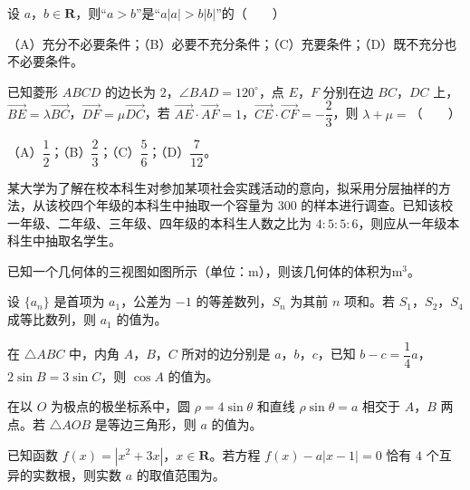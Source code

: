 \begin{question}
设 $a$，$b\in\mathbf R$，则“$a>b$”是“$a|a|>b|b|$”的\mbox{（　　）}

（A）充分不必要条件；（B）必要不充分条件；（C）充要条件；（D）既不充分也不必要条件。

\end{question}
\begin{question}
已知菱形 $ABCD$ 的边长为 $2$，$\angle BAD=120^\circ$，点 $E$，$F$ 分别在边 $BC$，$DC$ 上，$\overrightarrow{BE}=\lambda\overrightarrow{BC}$，$\overrightarrow{DF}=\mu\overrightarrow{DC}$，若 $\overrightarrow{AE}\cdot\overrightarrow{AF}=1$，$\overrightarrow{CE}\cdot\overrightarrow{CF}=-\dfrac23$，则 $\lambda+\mu=$\mbox{（　　）}

（A）$\dfrac12$；（B）$\dfrac23$；（C）$\dfrac56$；（D）$\dfrac{7}{12}$。

\end{question}

\begin{question}
某大学为了解在校本科生对参加某项社会实践活动的意向，拟采用分层抽样的方法，从该校四个年级的本科生中抽取一个容量为 $300$ 的样本进行调查。已知该校一年级、二年级、三年级、四年级的本科生人数之比为 $4:5:5:6$，则应从一年级本科生中抽取\gkblank{}名学生。

\Needspace{0.4\textheight}
\end{question}
\begin{question}
已知一个几何体的三视图如图所示（单位：m），则该几何体的体积为\gkblank{}$\mathrm m^3$。
\nopagebreak[4]
\begin{center}\end{center}
\nopagebreak[4]
\end{question}
\begin{question}
设 $\{a_n\}$ 是首项为 $a_1$，公差为 $-1$ 的等差数列，$S_n$ 为其前 $n$ 项和。若 $S_1$，$S_2$，$S_4$ 成等比数列，则 $a_1$ 的值为\gkblank{}。

\end{question}
\begin{question}
在 $\triangle ABC$ 中，内角 $A$，$B$，$C$ 所对的边分别是 $a$，$b$，$c$，已知 $b-c=\dfrac14a$，$2\sin B=3\sin C$，则 $\cos A$ 的值为\gkblank{}。

\end{question}
\begin{question}
在以 $O$ 为极点的极坐标系中，圆 $\rho=4\sin\theta$ 和直线 $\rho\sin\theta=a$ 相交于 $A$，$B$ 两点。若 $\triangle AOB$ 是等边三角形，则 $a$ 的值为\gkblank{}。

\end{question}
\begin{question}
已知函数 $f(x)=|x^2+3x|$，$x\in\mathbf R$。若方程 $f(x)-a|x-1|=0$ 恰有 $4$ 个互异的实数根，则实数 $a$ 的取值范围为\gkblank{}。

\end{question}

